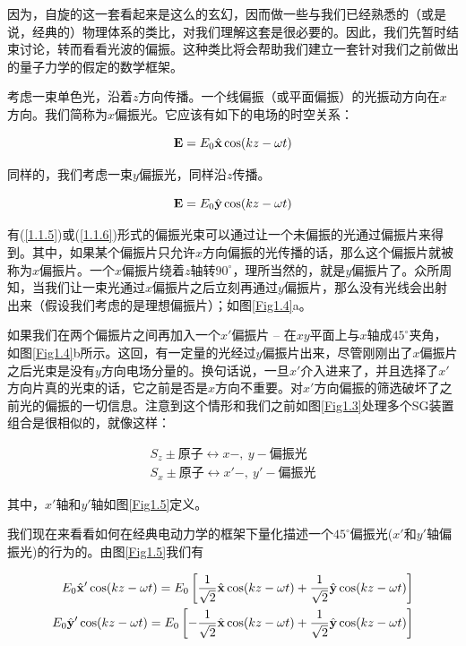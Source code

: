 \documentclass[UTF8,twoside]{ctexart}
\newcommand{\figref}[1]{图\ref{#1}}
\begin{document}
\noindent 因为，自旋的这一套看起来是这么的玄幻，因而做一些与我们已经熟悉的（或是说，经典的）物理体系的类比，对我们理解这套是很必要的。因此，我们先暂时结束讨论，转而看看光波的偏振。这种类比将会帮助我们建立一套针对我们之前做出的量子力学的假定的数学框架。

考虑一束单色光，沿着$z$方向传播。一个线偏振（或平面偏振）的光振动方向在$x$方向。我们简称为$x$偏振光。它应该有如下的电场的时空关系：

\begin{equation} \label{1.1.5}
{\bf E} = E_0 \hat{\bf x} \cos (kz - \omega t)
\end{equation}

\noindent 同样的，我们考虑一束$y$偏振光，同样沿$z$传播。

\begin{equation} \label{1.1.6}
{\bf E} = E_0 \hat{\bf y} \cos (kz - \omega t)
\end{equation}

\noindent 有(\ref{1.1.5})或(\ref{1.1.6})形式的偏振光束可以通过让一个未偏振的光通过偏振片来得到。其中，如果某个偏振片只允许$x$方向偏振的光传播的话，那么这个偏振片就被称为$x$偏振片。一个$x$偏振片绕着$z$轴转$90^{\circ}$，理所当然的，就是$y$偏振片了。众所周知，当我们让一束光通过$x$偏振片之后立刻再通过$y$偏振片，那么没有光线会出射出来（假设我们考虑的是理想偏振片）；如\figref{Fig1.4}a。

如果我们在两个偏振片之间再加入一个$x'$偏振片 -- 在$xy$平面上与$x$轴成$45^{\circ}$夹角，如\figref{Fig1.4}b所示。这回，有一定量的光经过$y$偏振片出来，尽管刚刚出了$x$偏振片之后光束是没有$y$方向电场分量的。换句话说，一旦$x'$介入进来了，并且选择了$x'$方向片真的光束的话，它之前是否是$x$方向不重要。对$x'$方向偏振的筛选破坏了之前光的偏振的一切信息。注意到这个情形和我们之前如图{\ref{Fig1.3}}处理多个SG装置组合是很相似的，就像这样：

\begin{equation} \label{1.1.7}
\begin{split}
S_z \pm \text{原子} \leftrightarrow x-,\ y-\text{偏振光}\\
S_x \pm \text{原子} \leftrightarrow x'-,\ y'-\text{偏振光}
\end{split}
\end{equation}

\noindent 其中，$x'$轴和$y'$轴如图{\ref{Fig1.5}}定义。

我们现在来看看如何在经典电动力学的框架下量化描述一个$45^{\circ}$偏振光($x'$和$y'$轴偏振光)的行为的。由图{\ref{Fig1.5}}我们有

\begin{equation} \label{1.1.8}
\begin{split}
E_0{\hat{\bf x}}'\cos(kz-\omega t) = E_0\left[\frac{1}{\sqrt{2}}{\hat{\bf x}}\cos(kz-\omega t) + \frac{1}{\sqrt{2}}{\hat{\bf y}}\cos(kz-\omega t)\right]\\
E_0{\hat{\bf y}}'\cos(kz-\omega t) = E_0\left[-\frac{1}{\sqrt{2}}{\hat{\bf x}}\cos(kz-\omega t) + \frac{1}{\sqrt{2}}{\hat{\bf y}}\cos(kz-\omega t)\right]
\end{split}
\end{equation}
\end{document}
